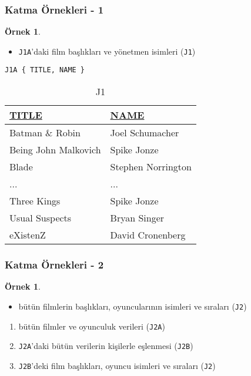 \documentclass[dvipsnames]{beamer}
\theoremstyle{definition}
\theoremstyle{example}
\newtheorem{ornek}[theorem]{Örnek}
\theoremstyle{plain}
\begin{document}
\begin{frame}[fragile]
  \frametitle{Katma Örnekleri - 1}

  \begin{ornek}
    \begin{itemize}
      \item \texttt{J1A}'daki film başlıkları ve yönetmen isimleri
         (\texttt{J1})
    \end{itemize}

    \begin{lstlisting}
J1A { TITLE, NAME }
    \end{lstlisting}

    \pause
    \vspace{-10pt}
    \begin{tiny}
    \begin{table}
      \caption{J1}
      \begin{tabular}{|l|l|}\hline
\underline{TITLE}    & \underline{NAME}\\[2pt]\hline\hline
Batman \& Robin      & Joel Schumacher \\\hline
Being John Malkovich & Spike Jonze     \\\hline
Blade                & Stephen Norrington\\\hline
...                  & ...             \\\hline
Three Kings          & Spike Jonze     \\\hline
Usual Suspects       & Bryan Singer    \\\hline
eXistenZ             & David Cronenberg\\\hline
      \end{tabular}
    \end{table}
    \end{tiny}
  \end{ornek}
\end{frame}

\begin{frame}
  \frametitle{Katma Örnekleri - 2}

  \begin{ornek}
    \begin{itemize}
      \item bütün filmlerin başlıkları, oyuncularının isimleri ve sıraları
        (\texttt{J2})
    \end{itemize}

    \pause
    \begin{enumerate}
      \item bütün filmler ve oyunculuk verileri (\texttt{J2A})

      \pause
      \item \texttt{J2A}'daki bütün verilerin kişilerle eşlenmesi (\texttt{J2B})

      \pause
      \item \texttt{J2B}'deki film başlıkları, oyuncu isimleri ve sıraları
	(\texttt{J2})
    \end{enumerate}
  \end{ornek}
\end{frame}
\end{document}
